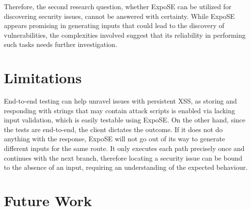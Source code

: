 Therefore, the second research question, whether ExpoSE can be utilized for discovering security issues, cannot be answered with certainty. While ExpoSE appears promising in generating inputs that could lead to the discovery of vulnerabilities, the complexities involved suggest that its reliability in performing such tasks needs further investigation. 


\section{Limitations}
\label{sec:limitations}
End-to-end testing can help unravel issues with persistent XSS, as storing and responding with strings that may contain attack scripts is enabled via lacking input validation, which is easily testable using ExpoSE. On the other hand, since the tests are end-to-end, the client dictates the outcome. If it does not do anything with the response, ExpoSE will not go out of its way to generate different inputs for the same route. It only executes each path precisely once and continues with the next branch, therefore locating a security issue can be bound to the absence of an input, requiring an understanding of the expected behaviour.

\section{Future Work}
\label{sec:ft-research}
